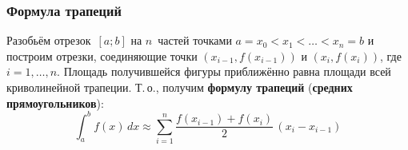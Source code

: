 \subsubsection{Формула трапеций}
 Разобьём отрезок~$[a; b]$ на $n$~частей точками $a = x_0 < x_1 < \ldots < x_n = b$ и построим отрезки, соединяющие точки $(x_{i-1}, f(x_{i-1}))$ и $(x_i, f(x_i))$, где $i = 1, \ldots, n$.
Площадь получившейся фигуры приближённо равна площади всей криволинейной трапеции.
Т.\,о., получим \textbf{формулу трапеций} (\textbf{средних прямоугольников}):
\begin{equation*}
\int_a^b f(x)\,dx \approx \sum_{i=1}^n \frac{f(x_{i-1}) + f(x_i)}2\,(x_i - x_{i-1})
\end{equation*}